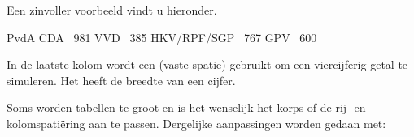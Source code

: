 \typebuffer

\haalbuffer

Een zinvoller voorbeeld vindt u hieronder.

\startbuffer
{}
\starttabel[|l|c|c|c|c|]
\HL
\VL \FIVE {}    \VL\SR
\HL
\VL {} \VL {} \VL {} \VL\SR
\DC              \DL[3]                 \DC              \DR
\VL              {}        \VL              \VL\SR
\HL
\VL PvdA             \VL\FR
\VL CDA             \VL ~981 \VL\MR
\VL VVD             \VL ~385 \VL\MR
\VL HKV/RPF/SGP     \VL ~767 \VL\MR
\VL GPV             \VL ~600 \VL\LR
\HL
\stoptabel
\stopbuffer

\typebuffer

In de laatste kolom wordt een \type{~} (vaste spatie)
gebruikt om een viercijferig getal te simuleren. Het
\type{~} heeft de breedte van een cijfer.

\haalbuffer

Soms worden tabellen te groot en is het wenselijk het korps
of de rij- en kolomspati\"ering aan te passen. Dergelijke
aanpassingen worden gedaan met:


